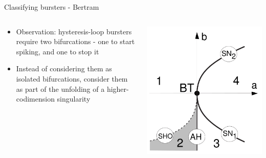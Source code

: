 \documentclass[,aspectratio=169]{beamer}
\begin{document}
\begin{frame}[label={sec:orgbe23b0a}]{Classifying bursters - Bertram}
\begin{columns}
\begin{column}{0.5\columnwidth}
\begin{itemize}
\item Observation: hysteresis-loop bursters require two bifurcations - one to start spiking, and one to stop it
\item Instead of considering them as isolated bifurcations, consider them as part of the unfolding of a higher-codimension singularity
\end{itemize}
\end{column}

\begin{column}{0.5\columnwidth}
\begin{center}
\includegraphics[height=0.8\textheight]{bog.png}
\end{center}
\end{column}
\end{columns}
\end{frame}
\end{document}

